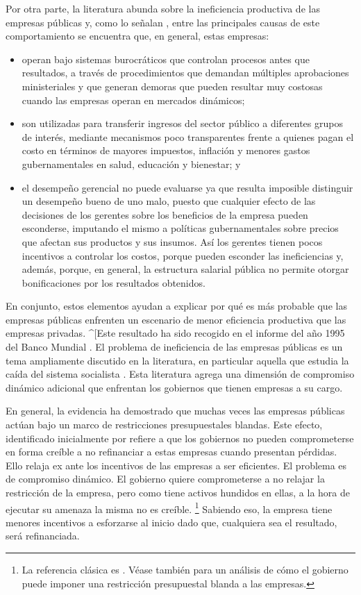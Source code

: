\documentclass[
  12pt,
  spanish,
]{book}
\begin{document}
Por otra parte, la literatura abunda sobre la ineficiencia productiva de las empresas públicas y, como lo señalan \citet{Jones1982}, entre las principales causas de este comportamiento se encuentra que, en general, estas empresas:

\begin{itemize}
\item
  operan bajo sistemas burocráticos que controlan procesos antes que resultados, a través de procedimientos que demandan múltiples aprobaciones ministeriales y que generan demoras que pueden resultar muy costosas cuando las empresas operan en mercados dinámicos;
\item
  son utilizadas para transferir ingresos del sector público a diferentes grupos de interés, mediante mecanismos poco transparentes frente a quienes pagan el costo en términos de mayores impuestos, inflación y menores gastos gubernamentales en salud, educación y bienestar; y
\item
  el desempeño gerencial no puede evaluarse ya que resulta imposible distinguir un desempeño bueno de uno malo, puesto que cualquier efecto de las decisiones de los gerentes sobre los beneficios de la empresa pueden esconderse, imputando el mismo a políticas gubernamentales sobre precios que afectan sus productos y sus insumos. Así los gerentes tienen pocos incentivos a controlar los costos, porque pueden esconder las ineficiencias y, además, porque, en general, la estructura salarial pública no permite otorgar bonificaciones por los resultados obtenidos.
\end{itemize}

En conjunto, estos elementos ayudan a explicar por qué es más probable que las empresas públicas enfrenten un escenario de menor eficiencia productiva que las empresas privadas.
\^{}{[}Este resultado ha sido recogido en el informe del año 1995 del Banco Mundial \citep{WorldBank1995}.
El problema de ineficiencia de las empresas públicas es un tema ampliamente discutido en la literatura, en particular aquella que estudia la caída del sistema socialista \citep{Roland2000}. Esta literatura agrega una dimensión de compromiso dinámico adicional que enfrentan los gobiernos que tienen empresas a su cargo.

En general, la evidencia ha demostrado que muchas veces las empresas públicas actúan bajo un marco de restricciones presupuestales blandas. Este efecto, identificado inicialmente por \citet{Kornai1980} refiere a que los gobiernos no pueden comprometerse en forma creíble a no refinanciar a estas empresas cuando presentan pérdidas. Ello relaja ex ante los incentivos de las empresas a ser eficientes. El problema es de compromiso dinámico. El gobierno quiere comprometerse a no relajar la restricción de la empresa, pero como tiene activos hundidos en ellas, a la hora de ejecutar su amenaza la misma no es creíble.
\footnote{La referencia clásica es \citet{Dewatripont1995}. Véase también \citet{Bergara2011} para un análisis de cómo el gobierno puede imponer una restricción presupuestal blanda a las empresas.}
Sabiendo eso, la empresa tiene menores incentivos a esforzarse al inicio dado que, cualquiera sea el resultado, será refinanciada.
\end{document}
